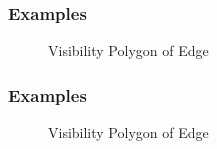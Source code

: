 \documentclass{beamer}
\begin{document}
\frame
{
\frametitle{Examples}

\begin{figure}
\begin{center}
\caption{\label{fig:Visibility Polygon of Edge}Visibility Polygon of Edge}
\end{center}
\end{figure}

}

\frame
{
\frametitle{Examples}
\begin{figure}
\begin{center}
\caption{\label{fig:Visibility Polygon of Edge}Visibility Polygon of Edge}
\end{center}
\end{figure}

}
\end{document}
